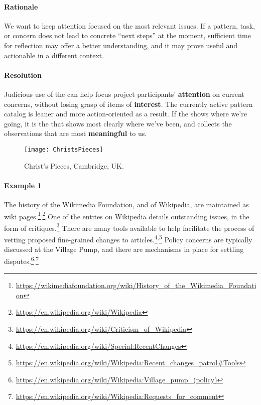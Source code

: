 \begin{refsection}
\paragraph{Rationale} 
We want to keep attention focused on the most relevant issues.  If a
pattern, task, or concern does not lead to concrete ``next steps'' at
the moment, sufficient time for reflection may offer a better
understanding, and it may prove useful and actionable in a different
context.

\paragraph{Resolution} 
Judicious use of the  can help focus project participants' \textbf{attention} on current concerns, without losing grasp of items of \textbf{interest}.  The currently active pattern catalog is leaner and more action-oriented as a result. If the  shows where we're going, it is the  that shows most clearly where we've been, and collects the observations that are most \textbf{meaningful} to us.

\begin{wrapfigure}{r}{.52\textwidth}
\vspace{-1.2cm}
\begin{center}
\texttt{[image: ChristsPieces]}
\end{center}
\vspace{-.5cm}
\caption{Christ's Pieces, Cambridge, UK.
\label{christs-pieces}}
\vspace{-1.7cm}
\end{wrapfigure}

\paragraph{Example 1} 
The history of the Wikimedia Foundation, and of Wiki\-pedia, are
maintained as wiki
pages.\footnote{\url{https://wikimediafoundation.org/wiki/History_of_the_Wikimedia_Foundation}}\textsuperscript{,}\footnote{\url{https://en.wikipedia.org/wiki/Wikipedia}}
One of the entries on Wikipedia details outstanding issues, in the
form of
critiques.\footnote{\url{https://en.wikipedia.org/wiki/Criticism_of_Wikipedia}}
There are many tools available to help facilitate the process of
vetting proposed fine-grained changes to
articles.\footnote{\url{https://en.wikipedia.org/wiki/Special:RecentChanges}}\textsuperscript{,}\footnote{\url{https://en.wikipedia.org/wiki/Wikipedia:Recent_changes_patrol\#Tools}}
Policy concerns are typically discussed at the Village Pump, and 
there are mechanisms in place for settling
disputes.\footnote{\url{https://en.wikipedia.org/wiki/Wikipedia:Village_pump_(policy)}}\textsuperscript{,}\footnote{\url{https://en.wikipedia.org/wiki/Wikipedia:Requests_for_comment}}


\end{refsection}
